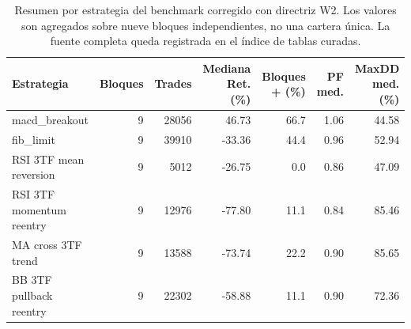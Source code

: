 \begin{table}[H]
\centering
\scriptsize
\setlength{\tabcolsep}{4pt}
\begin{tabular}{lrrrrrr}
\hline
Estrategia & Bloques & Trades & Mediana Ret. (\%) & Bloques + (\%) & PF med. & MaxDD med. (\%) \\
\hline
macd\_breakout & 9 & 28056 & 46.73 & 66.7 & 1.06 & 44.58 \\
fib\_limit & 9 & 39910 & -33.36 & 44.4 & 0.96 & 52.94 \\
RSI 3TF mean reversion & 9 & 5012 & -26.75 & 0.0 & 0.86 & 47.09 \\
RSI 3TF momentum reentry & 9 & 12976 & -77.80 & 11.1 & 0.84 & 85.46 \\
MA cross 3TF trend & 9 & 13588 & -73.74 & 22.2 & 0.90 & 85.65 \\
BB 3TF pullback reentry & 9 & 22302 & -58.88 & 11.1 & 0.90 & 72.36 \\
\hline
\end{tabular}
\caption{Resumen por estrategia del benchmark corregido con directriz W2. Los valores son agregados sobre nueve bloques independientes, no una cartera \'unica. La fuente completa queda registrada en el \'indice de tablas curadas.}
\label{tab:benchmarks-w2-resumen-estrategia}
\end{table}
